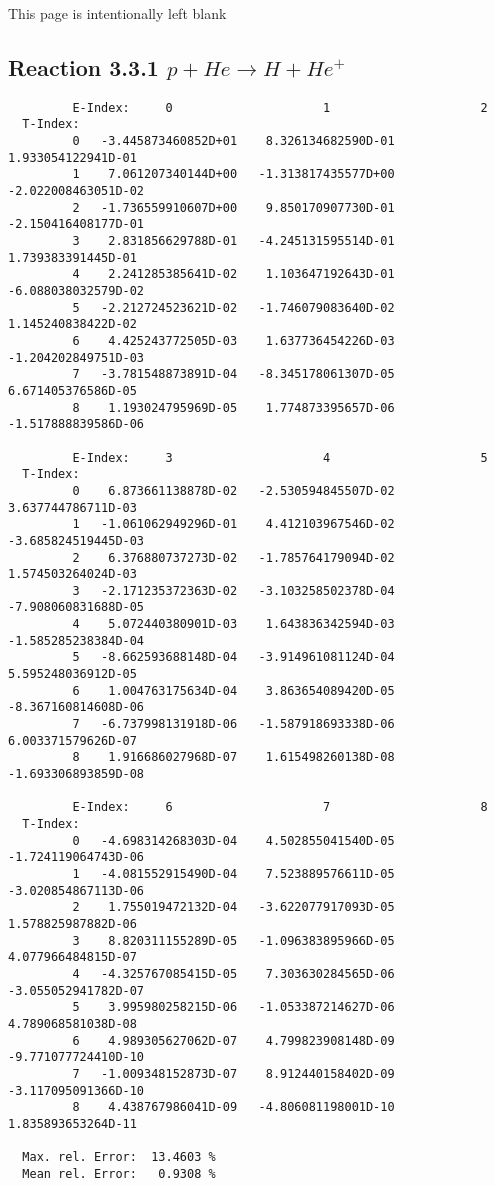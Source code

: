 \documentclass[12pt]{article}
\begin{document}
\newpage
This page is intentionally left blank
\newpage
\subsection{
Reaction 3.3.1  $  p + He \rightarrow  H + He^+ $
}



\begin{small}\begin{verbatim}
         E-Index:     0                     1                     2
  T-Index:
         0   -3.445873460852D+01    8.326134682590D-01    1.933054122941D-01
         1    7.061207340144D+00   -1.313817435577D+00   -2.022008463051D-02
         2   -1.736559910607D+00    9.850170907730D-01   -2.150416408177D-01
         3    2.831856629788D-01   -4.245131595514D-01    1.739383391445D-01
         4    2.241285385641D-02    1.103647192643D-01   -6.088038032579D-02
         5   -2.212724523621D-02   -1.746079083640D-02    1.145240838422D-02
         6    4.425243772505D-03    1.637736454226D-03   -1.204202849751D-03
         7   -3.781548873891D-04   -8.345178061307D-05    6.671405376586D-05
         8    1.193024795969D-05    1.774873395657D-06   -1.517888839586D-06

         E-Index:     3                     4                     5
  T-Index:
         0    6.873661138878D-02   -2.530594845507D-02    3.637744786711D-03
         1   -1.061062949296D-01    4.412103967546D-02   -3.685824519445D-03
         2    6.376880737273D-02   -1.785764179094D-02    1.574503264024D-03
         3   -2.171235372363D-02   -3.103258502378D-04   -7.908060831688D-05
         4    5.072440380901D-03    1.643836342594D-03   -1.585285238384D-04
         5   -8.662593688148D-04   -3.914961081124D-04    5.595248036912D-05
         6    1.004763175634D-04    3.863654089420D-05   -8.367160814608D-06
         7   -6.737998131918D-06   -1.587918693338D-06    6.003371579626D-07
         8    1.916686027968D-07    1.615498260138D-08   -1.693306893859D-08

         E-Index:     6                     7                     8
  T-Index:
         0   -4.698314268303D-04    4.502855041540D-05   -1.724119064743D-06
         1   -4.081552915490D-04    7.523889576611D-05   -3.020854867113D-06
         2    1.755019472132D-04   -3.622077917093D-05    1.578825987882D-06
         3    8.820311155289D-05   -1.096383895966D-05    4.077966484815D-07
         4   -4.325767085415D-05    7.303630284565D-06   -3.055052941782D-07
         5    3.995980258215D-06   -1.053387214627D-06    4.789068581038D-08
         6    4.989305627062D-07    4.799823908148D-09   -9.771077724410D-10
         7   -1.009348152873D-07    8.912440158402D-09   -3.117095091366D-10
         8    4.438767986041D-09   -4.806081198001D-10    1.835893653264D-11

  Max. rel. Error:  13.4603 %
  Mean rel. Error:   0.9308 %



\end{verbatim}\end{small}
\end{document}

